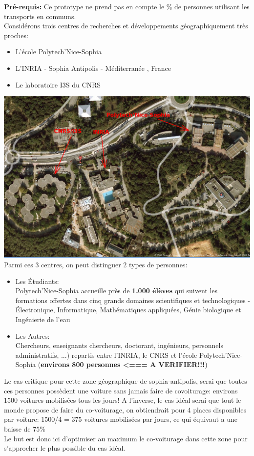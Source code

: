 \textbf{Pré-requis:} Ce prototype ne prend pas en compte le \% de personnes utilisant les transports en communs.\\

Considérons trois centres de recherches et développements géographiquement très proches:
\begin{itemize}
\item L'école Polytech'Nice-Sophia
\item L'INRIA - Sophia Antipolis - Méditerranée , France
\item Le laboratoire I3S du CNRS \\
\end{itemize}

\includegraphics[scale=0.35]{img/screenshot/geolock} \\

Parmi ces 3 centres, on peut distinguer 2 types de personnes:
\begin{itemize}
\item Les Étudiants: \\
	Polytech'Nice-Sophia accueille près de \textbf{1.000 élèves} qui suivent les formations offertes dans cinq grands domaines scientifiques et technologiques  - Électronique, Informatique, Mathématiques appliquées, Génie biologique et Ingénierie de l'eau
\item Les Autres: \\
	Chercheurs, enseignants chercheurs, doctorant, ingénieurs, personnels administratifs, ...)
	repartis entre l'INRIA, le CNRS et l'école Polytech'Nice-Sophia (\textbf{environs 800 personnes <=== A VERIFIER!!!}) \\
\end{itemize} 

Le cas critique pour cette zone géographique de sophia-antipolis, serai que toutes ces personnes possèdent une voiture sans jamais faire de covoiturage: environs 1500 voitures mobilisées tous les jours!
A l'inverse, le cas idéal serai que tout le monde propose de faire du co-voiturage, on obtiendrait pour 4 places disponibles par voiture:
1500/4 = 375 voitures mobilisées par jours, ce qui équivaut a une baisse de 75\% \\

Le but est donc ici d'optimiser au maximum le co-voiturage dans cette zone pour s'approcher le plus possible du cas idéal. 





